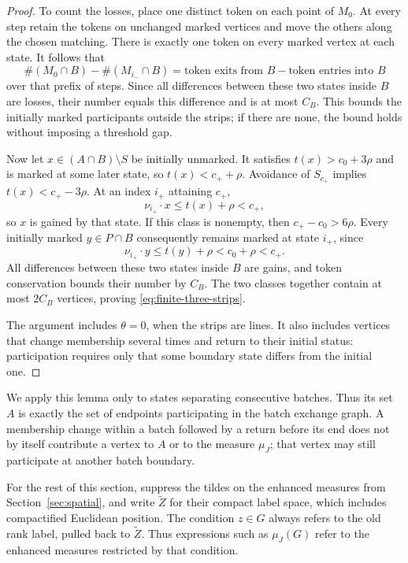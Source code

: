 \begin{proof}
To count the losses, place one distinct token on each point of $M_0$.
At every step retain the tokens on unchanged marked vertices and move
the others along the chosen matching. There is exactly one token on
every marked vertex at each state. It follows that
\[
 \#(M_0\cap B)-\#(M_{i_-}\cap B)
 =\text{token exits from }B-\text{token entries into }B
\]
over that prefix of steps. Since all differences between these two states inside $B$ are losses,
their number equals this difference and is at most $C_B$. This bounds
the initially marked participants outside the strips; if there are
none, the bound holds without imposing a threshold gap.

Now let $x\in(A\cap B)\setminus S$ be initially unmarked. It satisfies
$t(x)>c_0+3\rho$ and is marked at some later state, so
$t(x)<c_++\rho$. Avoidance of $S_{c_+}$ implies
$t(x)<c_+-3\rho$. At an index $i_+$ attaining $c_+$,
\[
 \nu_{i_+}\cdot x\leq t(x)+\rho<c_+,
\]
so $x$ is gained by that state. If this class is nonempty, then
$c_+-c_0>6\rho$. Every initially marked $y\in P\cap B$ consequently
remains marked at state $i_+$, since
\[
 \nu_{i_+}\cdot y\leq t(y)+\rho<c_0+\rho<c_+.
\]
All differences between these two states inside $B$ are gains, and token
conservation bounds their number by $C_B$. The two classes together
contain at most $2C_B$ vertices, proving
\eqref{eq:finite-three-strips}.

The argument includes $\theta=0$, when the strips are lines. It also
includes vertices that change membership several times and return to
their initial status: participation requires only that some boundary
state differs from the initial one.
\end{proof}

We apply this lemma only to states separating consecutive batches.
Thus its set $A$ is exactly the set of endpoints participating in the
batch exchange graph. A membership change within a batch followed by
a return before its end does not by itself contribute a vertex to $A$
or to the measure $\mu_J$; that vertex may still participate at another
batch boundary.

For the rest of this section, suppress the tildes on the enhanced
measures from Section~\ref{sec:spatial}, and write $\widetilde Z$ for
their compact label space, which includes compactified Euclidean position. The
condition $z\in G$ always refers to the old rank label, pulled back to
$\widetilde Z$. Thus expressions such as $\mu_J(G)$ refer to the
enhanced measures restricted by that condition.

